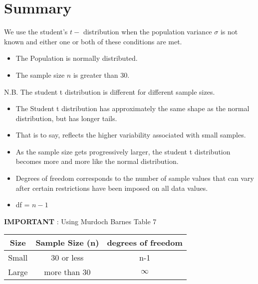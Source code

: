 \documentclass[]{report}
\begin{document}
\section{Summary}
We use the student's $t-$ distribution when the population variance $\sigma$ is not known and either one or both of these conditions are met.

\begin{itemize}
\item The Population is normally distributed.
\item The sample size $n$ is greater than 30.
\end{itemize}
N.B. The student t distribution is different for different sample sizes.

\begin{itemize}
\item The Student t distribution has approximately the same shape as the normal distribution, but has longer tails.
\item That is to say, reflects the higher variability associated with small samples.
\item As the sample size gets progressively larger, the student t distribution becomes more and more like the normal distribution.

\item Degrees of freedom corresponds to the number of sample values that can vary after certain restrictions have been imposed on all data values.

\item df = $n-1$
\end{itemize}



\begin{framed}
\textbf{IMPORTANT} : Using Murdoch Barnes Table 7\\ \bigskip
\begin{center}
\begin{tabular}{|c|c|c|}
\hline 
Size & Sample Size (n) & degrees of freedom \\ 
\hline 
Small & 30 or less & n-1 \\ 
\hline 
Large & more than 30 & $\infty$ \\ 
\hline 
\end{tabular} 
\end{center}
\end{framed}
\end{document}
